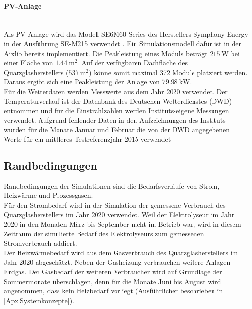 \paragraph{PV-Anlage}\ \\
Als PV-Anlage wird das Modell SE6M60-Series des Herstellers Symphony Energy in der Ausführung SE-M215 verwendet \citep{symphony_energy_coltd_se6m60_nodate}. Ein Simulationsmodell dafür ist in der Aixlib bereits implementiert. Die Peakleistung eines Moduls beträgt $\SI{215}{\W}$ bei einer Fläche von $\SI{1,44}{\m\squared}$. Auf der verfügbaren Dachfläche des Quarzglasherstellers ($\SI{537}{\m\squared}$) könne somit maximal 372 Module platziert werden. Daraus ergibt sich eine Peakleistung der Anlage von $\SI{79,98}{\kilo\W}$.\\
Für die Wetterdaten werden Messwerte aus dem Jahr 2020 verwendet. Der Temperaturverlauf ist der Datenbank des Deutschen Wetterdienstes (DWD) entnommen \citep{dwd_historische_nodate} und für die Einstrahlzahlen werden Instituts-eigene Messungen verwendet. Aufgrund fehlender Daten in den Aufzeichnungen des Instituts wurden für die Monate Januar und Februar die von der DWD angegebenen Werte für ein mittleres Testreferenzjahr 2015 verwendet \citep{dwd_klimaberatungsmodul_nodate}.

\subsection{Randbedingungen}
Randbedingungen der Simulationen sind die Bedarfsverläufe von Strom, Heizwärme und Prozessgasen.\\

Für den Strombedarf wird in der Simulation der gemessene Verbrauch des Quarzglasherstellers im Jahr 2020 verwendet. Weil der Elektrolyseur im Jahr 2020 in den Monaten März bis September nicht im Betrieb war, wird in diesem Zeitraum der simulierte Bedarf des Elektrolyseurs zum gemessenen Stromverbrauch addiert.\\

Der Heizwärmebedarf wird aus dem Gasverbrauch des Quarzglasherstellers im Jahr 2020 abgeschätzt. Neben der Gasheizung verbrauchen weitere Anlagen Erdgas. Der Gasbedarf der weiteren Verbraucher wird auf Grundlage der Sommermonate überschlagen, denn für die Monate Juni bis August wird angenommen, dass kein Heizbedarf vorliegt (Ausführlicher beschrieben in \ref{Apx:Systemkonzepte}).\\

